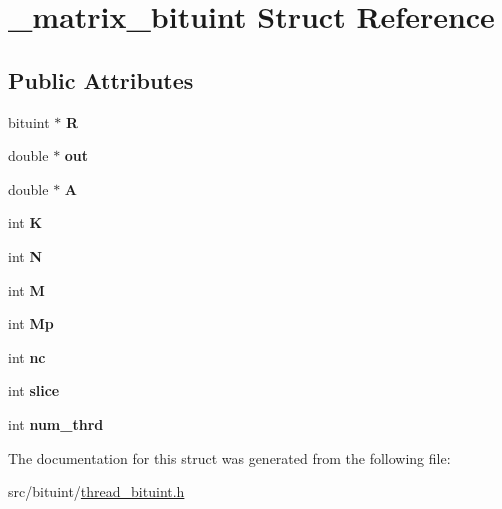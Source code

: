 \hypertarget{struct__matrix__bituint}{\section{\-\_\-matrix\-\_\-bituint \-Struct \-Reference}
\label{struct__matrix__bituint}
}
\subsection*{\-Public \-Attributes}
\begin{DoxyCompactItemize}
\item 
\hypertarget{struct__matrix__bituint_a374097c6098b310c508b13e2e80d2b8e}{bituint $\ast$ {\bfseries \-R}}\label{struct__matrix__bituint_a374097c6098b310c508b13e2e80d2b8e}

\item 
\hypertarget{struct__matrix__bituint_a8af80192778e47834ba09d634b7a91b6}{double $\ast$ {\bfseries out}}\label{struct__matrix__bituint_a8af80192778e47834ba09d634b7a91b6}

\item 
\hypertarget{struct__matrix__bituint_aba1ea69dcc12dcbc3a94e07363183d80}{double $\ast$ {\bfseries \-A}}\label{struct__matrix__bituint_aba1ea69dcc12dcbc3a94e07363183d80}

\item 
\hypertarget{struct__matrix__bituint_a62033313d129a0e5f0fbda2c32d79e8d}{int {\bfseries \-K}}\label{struct__matrix__bituint_a62033313d129a0e5f0fbda2c32d79e8d}

\item 
\hypertarget{struct__matrix__bituint_aef009edd7faff4d685ea401a4cb96ffb}{int {\bfseries \-N}}\label{struct__matrix__bituint_aef009edd7faff4d685ea401a4cb96ffb}

\item 
\hypertarget{struct__matrix__bituint_aa336238c029507cc6ce3ac6713f18c1a}{int {\bfseries \-M}}\label{struct__matrix__bituint_aa336238c029507cc6ce3ac6713f18c1a}

\item 
\hypertarget{struct__matrix__bituint_a6e3b1fb49a2c9aacbf0c80566a32ee5e}{int {\bfseries \-Mp}}\label{struct__matrix__bituint_a6e3b1fb49a2c9aacbf0c80566a32ee5e}

\item 
\hypertarget{struct__matrix__bituint_aab1947cba52d66a1c24f8b0a649be430}{int {\bfseries nc}}\label{struct__matrix__bituint_aab1947cba52d66a1c24f8b0a649be430}

\item 
\hypertarget{struct__matrix__bituint_a6c7c4fc9ee5c62c7bef03543186da9d4}{int {\bfseries slice}}\label{struct__matrix__bituint_a6c7c4fc9ee5c62c7bef03543186da9d4}

\item 
\hypertarget{struct__matrix__bituint_a26c601ce6b3c13c589d6bda5e4daf6c7}{int {\bfseries num\-\_\-thrd}}\label{struct__matrix__bituint_a26c601ce6b3c13c589d6bda5e4daf6c7}

\end{DoxyCompactItemize}


\-The documentation for this struct was generated from the following file\-:\begin{DoxyCompactItemize}
\item 
src/bituint/\hyperlink{thread__bituint_8h}{thread\-\_\-bituint.\-h}\end{DoxyCompactItemize}
